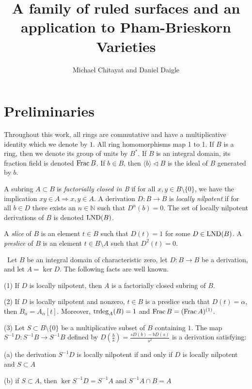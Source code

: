 \documentclass[12pt]{amsart}
\theoremstyle{plain}
\theoremstyle{definition}
\newcommand{\trdeg}{	\operatorname{{\rm trdeg}}}
\newcommand{\Frac}{		\operatorname{{\rm Frac}}}
\newcommand{\lb}{\langle}
\newcommand{\rb}{\rangle}
\newcommand{\Nat}{\ensuremath{\mathbb{N}}}
\newcommand{\lnd}{\operatorname{{\rm LND}}}
\begin{document}
\renewcommand{\baselinestretch}{1.07}




\title{A family of ruled surfaces and an application to Pham-Brieskorn Varieties}


\author{Michael Chitayat and Daniel Daigle}

\maketitle
  
\vfuzz=2pt


\section{Preliminaries}

Throughout this work, all rings are commutative and have a multiplicative identity which we denote by $1$.
All ring homomorphisms map 1 to 1. If $B$ is a ring, then we denote its group of units by $B^*$.
If $B$ is an integral domain, its fraction field is denoted $\Frac B$.
If $b \in B$, then $\lb b \rb \lhd B$ is the ideal of $B$ generated by $b$.  

A subring $A \subset B$ is \textit{factorially closed in B} if for all $x,y \in B \setminus\{0\}$, we have the implication $xy \in A \Rightarrow x,y \in A$. A derivation $D : B \to B$ is \textit{locally nilpotent} if for all $b \in D$ there exists an $n \in \Nat$ such that $D^n(b) = 0$.  The set of locally nilpotent derivations of $B$ is denoted $\lnd(B)$.

A \textit{slice} of $B$ is an element $t \in B$ such that $D(t) = 1$ for some $D \in \lnd(B)$.  A \textit{preslice} of $B$ is an element $t \in B \setminus A$ such that $D^2(t) = 0$.     

\begin{subsection}\  	
	Let $B$ be an integral domain of characteristic zero, let $D : B \to B$ be a derivation, and let $A = \ker D$. The following facts are well known. 
	
	(1) If $D$ is locally nilpotent, then $A$ is a factorially closed subring of $B$. 
	
	(2) If $D$ is locally nilpotent and nonzero, $t \in B$ is a preslice such that $D(t) = \alpha$, then $B_\alpha = A_\alpha[t]$. Moreover, $\trdeg_A(B) = 1$ and $\Frac B  = (\Frac A)^{(1)}$.
	
	(3) Let $S \subset B \setminus \{0\}$ be a multiplicative subset of $B$ containing $1$. The map $S^{-1}D : S^{-1} B \to S^{-1} B$ defined by $D(\frac{b}{s}) = \frac{sD(b)-bD(s)}{s^2}$ is a derivation satisfying: 
	
	\quad (a) the derivation $S^{-1}D$ is locally nilpotent if and only if $D$ is locally nilpotent and $S \subset A$
	
	\quad (b) if $S \subset A$, then $\ker S^{-1}D = S^{-1}A$ and $S^{-1}A \cap B = A$
\end{subsection}
\end{document}
